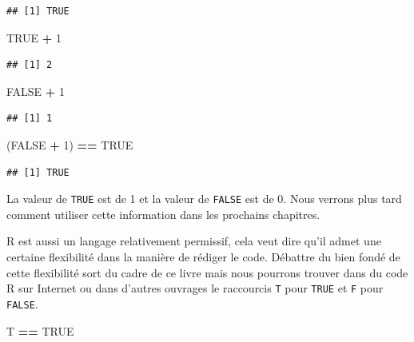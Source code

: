 \documentclass[]{book}
\newenvironment{Shaded}{\begin{snugshade}}{\end{snugshade}}
\newcommand{\DecValTok}[1]{\textcolor[rgb]{0.00,0.00,0.81}{#1}}
\newcommand{\StringTok}[1]{\textcolor[rgb]{0.31,0.60,0.02}{#1}}
\newcommand{\OtherTok}[1]{\textcolor[rgb]{0.56,0.35,0.01}{#1}}
\newcommand{\OperatorTok}[1]{\textcolor[rgb]{0.81,0.36,0.00}{\textbf{#1}}}
\newcommand{\NormalTok}[1]{#1}
\begin{document}
\begin{verbatim}
## [1] TRUE
\end{verbatim}

\begin{Shaded}
\begin{Highlighting}[]
\OtherTok{TRUE} \OperatorTok{+}\StringTok{ }\DecValTok{1}
\end{Highlighting}
\end{Shaded}

\begin{verbatim}
## [1] 2
\end{verbatim}

\begin{Shaded}
\begin{Highlighting}[]
\OtherTok{FALSE} \OperatorTok{+}\StringTok{ }\DecValTok{1}
\end{Highlighting}
\end{Shaded}

\begin{verbatim}
## [1] 1
\end{verbatim}

\begin{Shaded}
\begin{Highlighting}[]
\NormalTok{(}\OtherTok{FALSE} \OperatorTok{+}\StringTok{ }\DecValTok{1}\NormalTok{) }\OperatorTok{==}\StringTok{ }\OtherTok{TRUE}
\end{Highlighting}
\end{Shaded}

\begin{verbatim}
## [1] TRUE
\end{verbatim}

La valeur de \texttt{TRUE} est de 1 et la valeur de \texttt{FALSE} est
de 0. Nous verrons plus tard comment utiliser cette information dans les
prochains chapitres.

R est aussi un langage relativement permissif, cela veut dire qu'il
admet une certaine flexibilité dans la manière de rédiger le code.
Débattre du bien fondé de cette flexibilité sort du cadre de ce livre
mais nous pourrons trouver dans du code R sur Internet ou dans d'autres
ouvrages le raccourcis \texttt{T} pour \texttt{TRUE} et \texttt{F} pour
\texttt{FALSE}.

\begin{Shaded}
\begin{Highlighting}[]
\NormalTok{T }\OperatorTok{==}\StringTok{ }\OtherTok{TRUE}
\end{Highlighting}
\end{Shaded}
\end{document}
